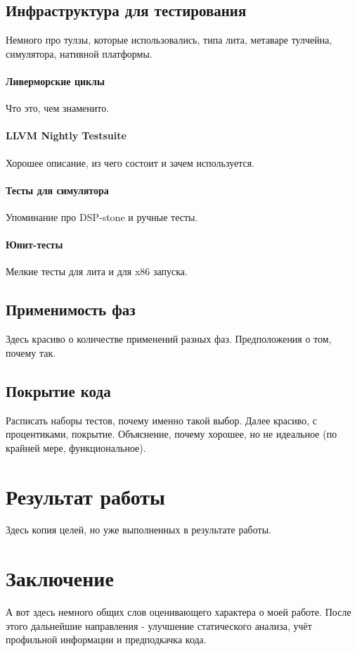\documentclass[12pt,a4paper]{article}
\begin{document}
\subsection{Инфраструктура для тестирования}

Немного про тулзы, которые использовались, типа лита, метаваре тулчейна, симулятора, нативной платформы.

\paragraph{Ливерморские циклы}

Что это, чем знаменито.

\paragraph{LLVM Nightly Testsuite}

Хорошее описание, из чего состоит и зачем используется.

\paragraph{Тесты для симулятора}

Упоминание про DSP-stone и ручные тесты.

\paragraph{Юнит-тесты}

Мелкие тесты для лита и для x86 запуска.

\subsection{Применимость фаз}

Здесь красиво о количестве применений разных фаз. Предположения о том, почему так.

\subsection{Покрытие кода}

Расписать наборы тестов, почему именно такой выбор. Далее красиво, с процентиками, покрытие. Объяснение, почему хорошее, но не идеальное (по крайней мере, функциональное).

\section{Результат работы}

Здесь копия целей, но уже выполненных в результате работы.

\section{Заключение}

А вот здесь немного общих слов оценивающего характера о моей работе. После этого дальнейшие направления - улучшение статического анализа, учёт профильной информации и предподкачка кода.
\end{document}
